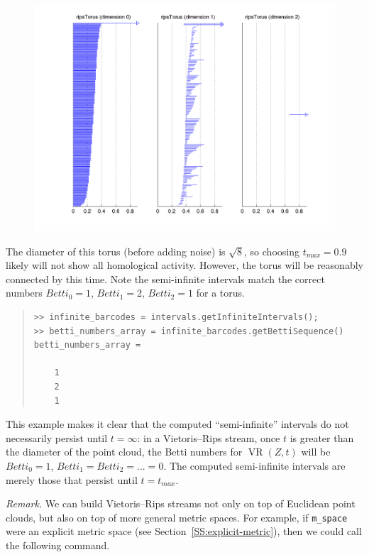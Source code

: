 \documentclass[amscd, amssymb, verbatim]{amsart}[12pt]
\theoremstyle{remark}
\theoremstyle{remark}
\theoremstyle{remark}
\DeclareMathOperator{\VR}{VR}
\begin{document}
\begin{figure}[htp]
	\begin{center}
    	\includegraphics[width=6in]{ripsTorus.png}
   	\end{center}
\end{figure}
\FloatBarrier

The diameter of this torus (before adding noise) is $\sqrt{8}$, so choosing $t_{max} = 0.9$ likely will not show all homological activity. However, the torus will be reasonably connected by this time. Note the semi-infinite intervals match the correct numbers $Betti_0 = 1$, $Betti_1 = 2$, $Betti_2 = 1$ for a torus.

\begin{quote} \begin{verbatim}
>> infinite_barcodes = intervals.getInfiniteIntervals();
>> betti_numbers_array = infinite_barcodes.getBettiSequence()
betti_numbers_array =

    1
    2
    1
\end{verbatim} \end{quote}

This example makes it clear that the computed ``semi-infinite'' intervals do not necessarily persist until $t = \infty$: in a Vietoris--Rips stream, once $t$ is greater than the diameter of the point cloud, the Betti numbers for $\VR(Z,t)$ will be $ Betti_0 = 1$, $Betti_1 = Betti_2 = ... = 0$. The computed semi-infinite intervals are merely those that persist until $t = t_{max}$. 

{\em Remark.} We can build Vietoris--Rips streams not only on top of Euclidean point clouds, but also on top of more general metric spaces. For example, if \texttt{m\_space} were an explicit metric space (see Section~\ref{SS:explicit-metric}), then we could call the following command.
\end{document}
